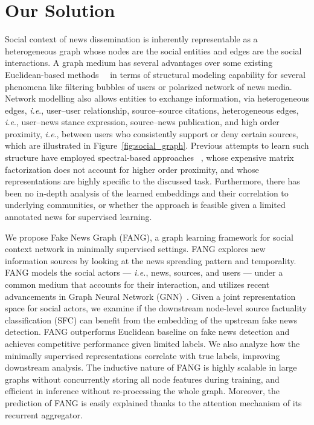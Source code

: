 \documentclass[fyp]{socreport}
\theoremstyle{definition}
\theoremstyle{hypothesis}
\begin{document}
\section{Our Solution}
Social context of news dissemination is inherently representable as a heterogeneous graph whose nodes are the social entities and edges are the social interactions. A graph medium has several advantages over some existing Euclidean-based methods~\cite{ruchansky2017csi}~\cite{liu2018early} in terms of structural modeling capability for several phenomena like filtering bubbles of users or polarized network of news media. Network modelling also allows entities to exchange information, via heterogeneous edges, \textit{i.e}., 
user--user relationship, source--source citations, heterogeneous edges, \textit{i.e}., user--news stance expression, source--news publication, and high order proximity, \textit{i.e}., between users who consistently support or deny certain sources, which are illustrated in  
Figure~\ref{fig:social_graph}.  
Previous attempts to learn such structure have employed spectral-based approaches ~\cite{shu2019beyond,gupta2012evaluating}, whose expensive matrix factorization does not account for higher order proximity, and whose representations are highly specific to the discussed task. Furthermore, there has been no in-depth analysis of the learned embeddings and their correlation to underlying communities, or whether the approach is feasible given a limited annotated news for supervised learning.

We propose Fake News Graph (FANG), a graph learning framework for social context network in minimally supervised settings. 
%
FANG explores new information sources by looking at the news spreading pattern and temporality. FANG models the social actors --- \textit{i.e.}, news, sources, and users --- under a common medium that accounts for their interaction, and utilizes recent advancements in Graph Neural Network (GNN)~\cite{kipf2016semi,grover2016node2vec}. Given a joint representation space for social actors, we examine if the downstream node-level source factuality classification (SFC) can benefit from the embedding of the upstream fake news detection. FANG outperforms Euclidean baseline on fake news detection and achieves competitive performance given limited labels. We also analyze how the minimally supervised representations correlate with true labels, improving downstream analysis. The inductive nature of FANG is highly scalable in large graphs without concurrently storing all node features during training, and efficient in inference without re-processing the whole graph. Moreover, the prediction of FANG is easily explained thanks to the attention mechanism of its recurrent aggregator.
\end{document}
